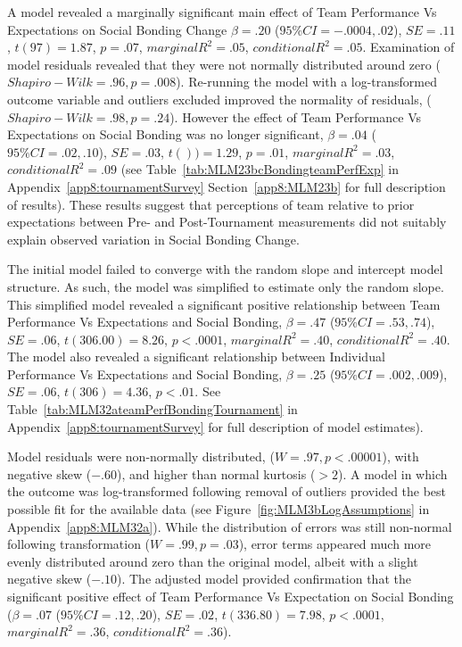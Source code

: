 \begin{CJK}{UTF8}{gbsn}
  A model revealed a marginally significant main effect of Team Performance Vs Expectations on Social Bonding Change $\beta = .20$ ($95\% CI =  -.0004, .02$), $SE = .11$, $t(97) = 1.87$, $p = .07$, $marginal R^2 = .05$, $conditional R^2 = .05$.  Examination of model residuals revealed that they were not normally distributed around zero ($Shapiro-Wilk = .96, p = .008$).  Re-running the model with a log-transformed outcome variable and outliers excluded improved the normality of residuals, ($Shapiro-Wilk = .98, p = .24$).
  However the effect of Team Performance Vs Expectations on Social Bonding was no longer significant, $\beta = .04$ ($95\% CI =  .02, .10$), $SE = .03$, $t()) = 1.29$, $p = .01$, $marginal R^2 = .03$, $conditional R^2 = .09$ (see Table~\ref{tab:MLM23bcBondingteamPerfExp} in Appendix~\ref{app8:tournamentSurvey} Section~\ref{app8:MLM23b} for full description of results).  These results suggest that perceptions of team relative to prior expectations between Pre- and Post-Tournament measurements did not suitably explain observed variation in Social Bonding Change.



  The initial model failed to converge with the random slope and intercept model structure.  As such, the model was simplified to estimate only the random slope. This simplified model revealed a significant positive relationship between Team Performance Vs Expectations and Social Bonding, $\beta = .47$ ($95\% CI =  .53, .74$), $SE = .06$, $t(306.00) = 8.26$, $p < .0001$, $marginal R^2 = .40$, $conditional R^2 = .40$.  The model also revealed a significant relationship between Individual Performance Vs Expectations and Social Bonding, $\beta = .25$ ($95\% CI =  .002, .009$), $SE = .06$, $t(306) = 4.36$, $p < .01$. See Table~\ref{tab:MLM32ateamPerfBondingTournament} in Appendix~\ref{app8:tournamentSurvey} for full description of model estimates).

  Model residuals were non-normally distributed, ($W = .97, p < .00001$), with negative skew ($-.60$), and higher than normal kurtosis ($> 2$).  A model in which the outcome was log-transformed following removal of outliers provided the best possible fit for the available data (see Figure~\ref{fig:MLM3bLogAssumptions} in Appendix~\ref{app8:MLM32a}).  While the distribution of errors was still non-normal following transformation ($W = .99, p = .03$),  error terms appeared much more evenly distributed around zero than the original model, albeit with a slight negative skew ($-.10$).
  The adjusted model provided confirmation that the significant positive effect of Team Performance Vs Expectation on Social Bonding ($\beta = .07$ ($95\% CI =  .12, .20$), $SE = .02$, $t(336.80) = 7.98$, $p < .0001$, $marginal R^2 = .36$, $conditional R^2 = .36$).



\end{CJK}
